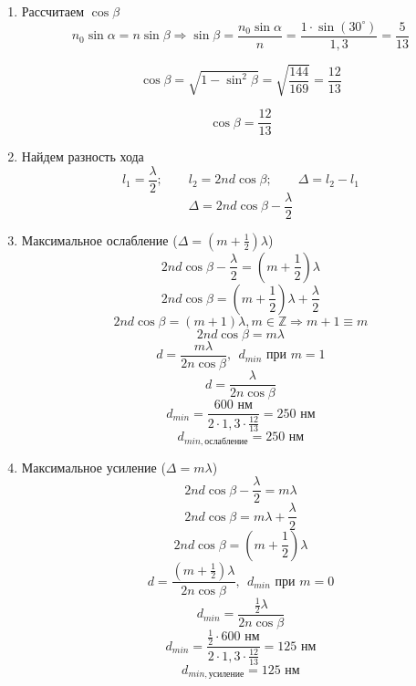 \begin{enumerate}
    \item Рассчитаем $\cos\beta$
        $$n_0\sin\alpha=n\sin\beta\Rightarrow\sin\beta=\frac{n_0\sin\alpha}{n}=\frac{1\cdot\sin(30^\circ)}{1,3}=\frac{5}{13}$$

        $$\cos\beta=\sqrt{1-\sin^2\beta}=\sqrt{\frac{144}{169}}=\frac{12}{13}$$

        $$\cos\beta=\frac{12}{13}$$

    \item Найдем разность хода
        $$l_1=\frac\lambda2;\qquad l_2=2nd\cos\beta;\qquad \Delta=l_2-l_1$$
        $$\Delta=2nd\cos\beta-\frac{\lambda}{2}$$
    \item Максимальное ослабление ($\Delta=(m+\frac12)\lambda$)
        $$2nd\cos\beta-\frac{\lambda}{2} = (m+\frac12)\lambda$$
        $$2nd\cos\beta = (m+\frac12)\lambda + \frac{\lambda}{2}$$
        $$2nd\cos\beta = (m+1)\lambda, m\in\mathbb{Z} \Rightarrow m+1\equiv m$$
        $$2nd\cos\beta = m\lambda$$
        $$d = \frac{m\lambda}{2n\cos\beta},~~d_{min}\text{ при } m=1$$
        $$d = \frac{\lambda}{2n\cos\beta}$$
        $$d_{min} = \frac{600\text{ нм}}{2\cdot 1,3 \cdot \frac{12}{13}}=250\text{ нм}$$
        $$\boxed{d_{min, \text{ослабление}} = 250\text{ нм}}$$
    \item Максимальное усиление ($\Delta=m\lambda$)
        $$2nd\cos\beta-\frac{\lambda}{2} = m\lambda$$
        $$2nd\cos\beta = m\lambda + \frac{\lambda}{2}$$
        $$2nd\cos\beta = (m+\frac12)\lambda$$
        $$d = \frac{(m+\frac12)\lambda}{2n\cos\beta},~~d_{min}\text{ при } m=0$$
        $$d_{min} = \frac{\frac12\lambda}{2n\cos\beta}$$
        $$d_{min} = \frac{\frac{1}{2}\cdot600\text{ нм}}{2\cdot 1,3 \cdot \frac{12}{13}}=125\text{ нм}$$
        $$\boxed{d_{min, \text{усиление}} = 125\text{ нм}}$$
        
\end{enumerate}
